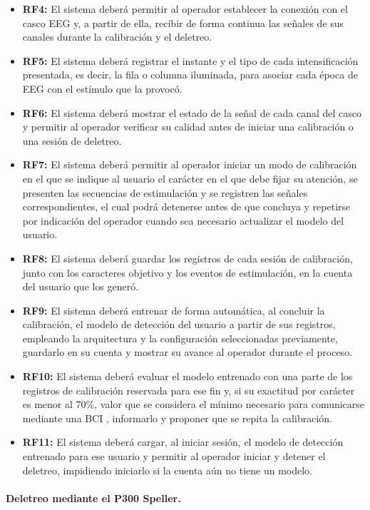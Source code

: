 \begin{itemize}
  \item \textbf{RF4:} El sistema deberá permitir al operador establecer la conexión con el casco EEG y, a partir de ella, recibir de forma continua las
  señales de sus canales durante la calibración y el deletreo.
  \item \textbf{RF5:} El sistema deberá registrar el instante y el tipo de cada intensificación
  presentada, es decir, la fila o columna iluminada, para asociar cada época de EEG con el
  estímulo que la provocó.
  \item \textbf{RF6:} El sistema deberá mostrar el estado de la señal de cada canal del casco y
  permitir al operador verificar su calidad antes de iniciar una calibración o una sesión de deletreo.
  \item \textbf{RF7:} El sistema deberá permitir al operador iniciar un modo de calibración en el que se indique al
  usuario el carácter en el que debe fijar su atención, se presenten las secuencias de
  estimulación y se registren las señales correspondientes, el cual podrá detenerse antes de que concluya y repetirse por indicación del operador cuando sea
  necesario actualizar el modelo del usuario.
  \item \textbf{RF8:} El sistema deberá guardar los registros de cada sesión de calibración, junto
  con los caracteres objetivo y los eventos de estimulación, en la cuenta del usuario que los
  generó.
  \item \textbf{RF9:} El sistema deberá entrenar de forma automática, al concluir la calibración, el modelo de detección del usuario a partir de sus registros, empleando la arquitectura y la configuración seleccionadas previamente, guardarlo en su cuenta y mostrar su avance al operador durante el proceso.
  \item \textbf{RF10:} El sistema deberá evaluar el modelo entrenado con una parte de los registros
  de calibración reservada para ese fin y, si su exactitud por carácter es menor al 70\%, valor que se
  considera el mínimo necesario para comunicarse mediante una BCI \cite{kubler2001}, informarlo y
  proponer que se repita la calibración.
  \item \textbf{RF11:} El sistema deberá cargar, al iniciar sesión, el modelo de detección
  entrenado para ese usuario y permitir al operador iniciar y detener el deletreo, impidiendo iniciarlo si la cuenta aún no tiene un modelo.
\end{itemize}

\paragraph{Deletreo mediante el P300 Speller.}

